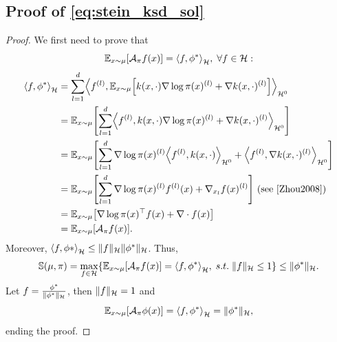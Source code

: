 \documentclass{article}
\newcommand{\E}{\mathbb{E}}
\renewcommand{\S}{\mathbb{S}}
\newcommand{\A}{\mathcal{A}}
\renewcommand{\H}{\mathcal{H}}
\renewcommand{\S}{\mathbb{S}}
\DeclarePairedDelimiter{\norm}{\|}{\|}
\DeclarePairedDelimiter{\bra}{\{}{\}}
\DeclarePairedDelimiter{\sq}{[}{]}
\DeclarePairedDelimiter{\sca}{\langle}{\rangle}
\begin{document}
\subsection{Proof of \eqref{eq:stein_ksd_sol}}
\begin{proof}\label{proof:KSD}
  We first need to prove that
  $$
  \E_{x \sim \mu} \sq*{ \A_\pi f(x) } = \sca*{f, \phi^*}_\H, \; \forall f \in \H:
  $$
  \begin{equation*}
    \begin{split}
      \sca*{f, \phi^*}_\H &= \sum_{l=1}^d \sca*{ f^{(l)},
        \E_{x \sim \mu}\sq*{ k(x, \cdot) \nabla \log \pi(x)^{(l)} + \nabla k(x, \cdot)^{(l)}} }_{\H^0} \\
        &= \E_{x \sim \mu}\sq*{ \sum_{l=1}^d \sca*{f^{(l)}, k(x, \cdot)
          \nabla \log \pi(x)^{(l)} + \nabla k(x, \cdot)^{(l)} }_{\H^0} } \\
        &= \E_{x \sim \mu}\sq*{ \sum_{l=1}^d \nabla \log \pi(x)^{(l)}
          \sca*{ f^{(l)}, k(x, \cdot) }_{\H^0} + \sca*{ f^{(l)}, \nabla k(x, \cdot)^{(l)} }_{\H^0} } \\
        &= \E_{x \sim \mu}\sq*{ \sum_{l=1}^d \nabla \log \pi(x)^{(l)} f^{(l)}(x) + \nabla_{x_l} f(x)^{(l)} }
         \text{ (see \cite{Zhou2008}) } \\
        &= \E_{x \sim \mu}\sq*{ \nabla \log \pi(x)^\top f(x) + \nabla \cdot f(x) } \\
        &= \E_{x \sim \mu} \sq*{ \A_\pi f(x) }.
    \end{split}
  \end{equation*}
  Moreover, $\sca*{ f, \phi* }_\H \leq \norm{f}_\H \norm{\phi^*}_\H$.
  Thus,
  $$
  \S(\mu, \pi) =
    \max_{f \in \H} \bra*{ \E_{x \sim \mu}[\A_\pi f (x)] = \sca*{f, \phi^*}_\H, \; s.t. \; \|f\|_{\H} \leq 1 }
    \leq \norm{\phi^*}_\H.
  $$
  Let $f = \frac{\phi^*}{\norm{\phi^*}_\H}$, then $\norm{f}_\H = 1$ and
  $$
  \E_{x \sim \mu}[\A_\pi \phi (x)] = \sca*{f, \phi^*}_\H = \norm{\phi^*}_\H,
  $$
  ending the proof.
\end{proof}
\end{document}
